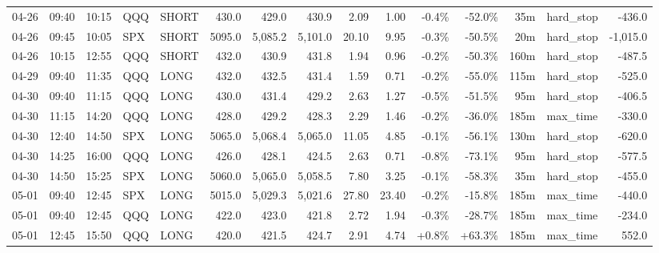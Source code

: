 \documentclass[11pt,a4paper,twoside]{article}
\begin{document}
\begin{landscape}
\begin{center}
\begin{longtable}{>{\color{txtmain}}l l l l l r r r r r r r r >{\color{txtmain}}l r}
04-26 & 09:40 & 10:15 & QQQ & SHORT & 430.0 & 429.0 & 430.9 & 2.09 & 1.00 & \textcolor{lossred}{-0.4\%} & \textcolor{lossred}{-52.0\%} & 35m & hard\_stop & \textcolor{lossred}{-436.0} \\
04-26 & 09:45 & 10:05 & SPX & SHORT & 5095.0 & 5,085.2 & 5,101.0 & 20.10 & 9.95 & \textcolor{lossred}{-0.3\%} & \textcolor{lossred}{-50.5\%} & 20m & hard\_stop & \textcolor{lossred}{-1,015.0} \\
04-26 & 10:15 & 12:55 & QQQ & SHORT & 432.0 & 430.9 & 431.8 & 1.94 & 0.96 & \textcolor{lossred}{-0.2\%} & \textcolor{lossred}{-50.3\%} & 160m & hard\_stop & \textcolor{lossred}{-487.5} \\
04-29 & 09:40 & 11:35 & QQQ & LONG & 432.0 & 432.5 & 431.4 & 1.59 & 0.71 & \textcolor{lossred}{-0.2\%} & \textcolor{lossred}{-55.0\%} & 115m & hard\_stop & \textcolor{lossred}{-525.0} \\
04-30 & 09:40 & 11:15 & QQQ & LONG & 430.0 & 431.4 & 429.2 & 2.63 & 1.27 & \textcolor{lossred}{-0.5\%} & \textcolor{lossred}{-51.5\%} & 95m & hard\_stop & \textcolor{lossred}{-406.5} \\
04-30 & 11:15 & 14:20 & QQQ & LONG & 428.0 & 429.2 & 428.3 & 2.29 & 1.46 & \textcolor{lossred}{-0.2\%} & \textcolor{lossred}{-36.0\%} & 185m & max\_time & \textcolor{lossred}{-330.0} \\
04-30 & 12:40 & 14:50 & SPX & LONG & 5065.0 & 5,068.4 & 5,065.0 & 11.05 & 4.85 & \textcolor{lossred}{-0.1\%} & \textcolor{lossred}{-56.1\%} & 130m & hard\_stop & \textcolor{lossred}{-620.0} \\
04-30 & 14:25 & 16:00 & QQQ & LONG & 426.0 & 428.1 & 424.5 & 2.63 & 0.71 & \textcolor{lossred}{-0.8\%} & \textcolor{lossred}{-73.1\%} & 95m & hard\_stop & \textcolor{lossred}{-577.5} \\
04-30 & 14:50 & 15:25 & SPX & LONG & 5060.0 & 5,065.0 & 5,058.5 & 7.80 & 3.25 & \textcolor{lossred}{-0.1\%} & \textcolor{lossred}{-58.3\%} & 35m & hard\_stop & \textcolor{lossred}{-455.0} \\
05-01 & 09:40 & 12:45 & SPX & LONG & 5015.0 & 5,029.3 & 5,021.6 & 27.80 & 23.40 & \textcolor{lossred}{-0.2\%} & \textcolor{lossred}{-15.8\%} & 185m & max\_time & \textcolor{lossred}{-440.0} \\
05-01 & 09:40 & 12:45 & QQQ & LONG & 422.0 & 423.0 & 421.8 & 2.72 & 1.94 & \textcolor{lossred}{-0.3\%} & \textcolor{lossred}{-28.7\%} & 185m & max\_time & \textcolor{lossred}{-234.0} \\
05-01 & 12:45 & 15:50 & QQQ & LONG & 420.0 & 421.5 & 424.7 & 2.91 & 4.74 & \textcolor{wingreen}{+0.8\%} & \textcolor{wingreen}{+63.3\%} & 185m & max\_time & \textcolor{wingreen}{552.0} \\

\end{longtable}
\end{center}
\end{landscape}
\end{document}
